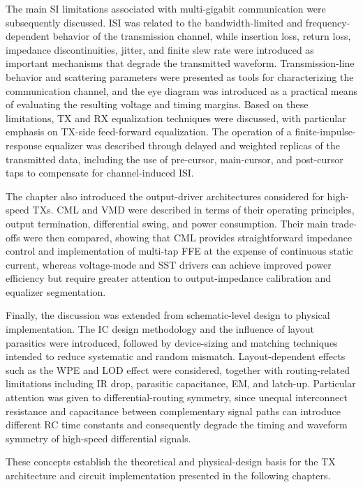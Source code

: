 The main \ac{SI} limitations associated with multi-gigabit communication were subsequently discussed. \ac{ISI} was related to the bandwidth-limited and frequency-dependent behavior of the transmission channel, while insertion loss, return loss, impedance discontinuities, jitter, and finite slew rate were introduced as important mechanisms that degrade the transmitted waveform. Transmission-line behavior and scattering parameters were presented as tools for characterizing the communication channel, and the eye diagram was introduced as a practical means of evaluating the resulting voltage and timing margins. Based on these limitations, \ac{TX} and \ac{RX} equalization techniques were discussed, with particular emphasis on \ac{TX}-side feed-forward equalization. The operation of a finite-impulse-response equalizer was described through delayed and weighted replicas of the transmitted data, including the use of pre-cursor, main-cursor, and post-cursor taps to compensate for channel-induced \ac{ISI}.

The chapter also introduced the output-driver architectures considered for high-speed \acsp{TX}. \ac{CML} and \ac{VMD} were described in terms of their operating principles, output termination, differential swing, and power consumption. Their main trade-offs were then compared, showing that \ac{CML} provides straightforward impedance control and implementation of multi-tap \ac{FFE} at the expense of continuous static current, whereas voltage-mode and \ac{SST} drivers can achieve improved power efficiency but require greater attention to output-impedance calibration and equalizer segmentation.

Finally, the discussion was extended from schematic-level design to physical implementation. The \ac{IC} design methodology and the influence of layout parasitics were introduced, followed by device-sizing and matching techniques intended to reduce systematic and random mismatch. Layout-dependent effects such as the \ac{WPE} and \ac{LOD} effect were considered, together with routing-related limitations including IR drop, parasitic capacitance, \ac{EM}, and latch-up. Particular attention was given to differential-routing symmetry, since unequal interconnect resistance and capacitance between complementary signal paths can introduce different RC time constants and consequently degrade the timing and waveform symmetry of high-speed differential signals.

These concepts establish the theoretical and physical-design basis for the \ac{TX} architecture and circuit implementation presented in the following chapters.